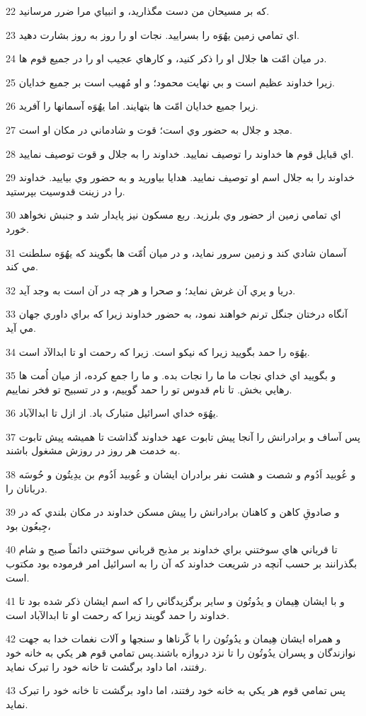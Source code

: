 \par 22 که بر مسيحان من دست مگذاريد، و انبياي مرا ضرر مرسانيد.
\par 23 اي تمامي زمين يهُوَه را بسراييد. نجات او را روز به روز بشارت دهيد.
\par 24 در ميان امّت ها جلال او را ذکر کنيد، و کارهاي عجيب او را در جميع قوم ها.
\par 25 زيرا خداوند عظيم است و بي نهايت محمود؛ و او مُهيب است بر جميع خدايان.
\par 26 زيرا جميع خدايان امّت ها بتهايند. اما يهُوَه آسمانها را آفريد.
\par 27 مجد و جلال به حضور وي است؛ قوت و شادماني در مکان او است.
\par 28 اي قبايل قوم ها خداوند را توصيف نماييد. خداوند را به جلال و قوت توصيف نماييد.
\par 29 خداوند را به جلال اسم او توصيف نماييد. هدايا بياوريد و به حضور وي بياييد. خداوند را در زينت قدوسيت بپرستيد.
\par 30 اي تمامي زمين از حضور وي بلرزيد. ربع مسکون نيز پايدار شد و جنبش نخواهد خورد.
\par 31 آسمان شادي کند و زمين سرور نمايد، و در ميان اُمّت ها بگويند که يهُوَه سلطنت مي کند.
\par 32 دريا و پري آن غرش نمايد؛ و صحرا و هر چه در آن است به وجد آيد.
\par 33 آنگاه درختان جنگل ترنم خواهند نمود، به حضور خداوند زيرا که براي داوري جهان مي آيد.
\par 34 يهُوَه را حمد بگوييد زيرا که نيکو است. زيرا که رحمت او تا ابدالآد است.
\par 35 و بگوييد اي خداي نجات ما ما را نجات بده. و ما را جمع کرده، از ميان اُمت ها رهايي بخش. تا نام قدوس تو را حمد گوييم، و در تسبيح تو فخر نماييم.
\par 36 يهُوَه خداي اسرائيل متبارک باد. از ازل تا ابدالآباد.
\par 37 پس آساف و برادرانش را آنجا پيش تابوت عهد خداوند گذاشت تا هميشه پيش تابوت به خدمت هر روز در روزش مشغول باشند.
\par 38 و عُوبيد اَدُوم و شصت و هشت نفر برادران ايشان و عُوبيد اَدُوم بن يدِيتُون و حُوسَه دربانان را.
\par 39 و صادوقِ کاهن و کاهنان برادرانش را پيش مسکن خداوند در مکان بلندي که در جِبعُون بود،
\par 40 تا قرباني هاي سوختني براي خداوند بر مذبح قرباني سوختني دائماً صبح و شام بگذرانند بر حسب آنچه در شريعت خداوند که آن را به اسرائيل امر فرموده بود مکتوب است.
\par 41 و با ايشان هِيمان و يدُوتُون و ساير برگزيدگاني را که اسم ايشان ذکر شده بود تا خداوند را حمد گويند زيرا که رحمت او تا ابدالآباد است.
\par 42 و همراه ايشان هِيمان و يدُوتُون را با کّرناها و سنجها و آلات نغمات خدا به جهت نوازندگان و پسران يدُوتُون را تا نزد دروازه باشند.پس تمامي قوم هر يکي به خانه خود رفتند، اما داود برگشت تا خانه خود را تبرک نمايد.
\par 43 پس تمامي قوم هر يکي به خانه خود رفتند، اما داود برگشت تا خانه خود را تبرک نمايد.
 
